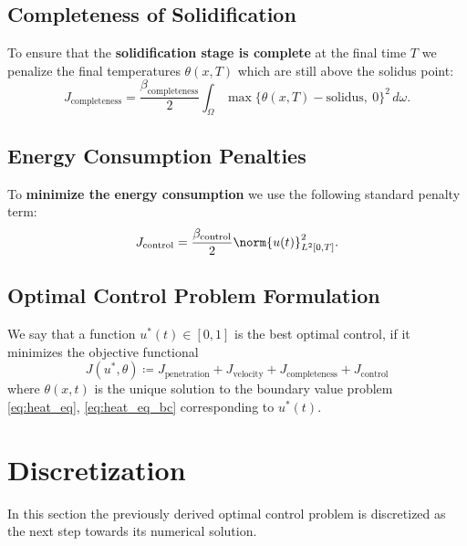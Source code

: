 \subsection{Completeness of Solidification}

To ensure that the \textbf{solidification stage is complete} at the final time $T$ we penalize the final temperatures $\theta(x, T)$ which are still above the solidus point:
\begin{equation}
	J_{\text{completeness}} =
	\frac{\beta_\text{completeness}}{2} \int_{\Omega} \max\{ \theta(x, T) - \text{solidus},\ 0 \}^2\, d\omega.
\end{equation}

\subsection{Energy Consumption Penalties}


To \textbf{minimize the energy consumption} we use the following standard penalty term:
\begin{equation}
	J_{\text{control}} =
	\frac{\beta_\text{control}}{2} \norm{u(t)}^2_{L^2[0,T]}.
\end{equation}



\subsection{Optimal Control Problem Formulation}

We say that a function $u^*(t) \in [0,1]$ is the best optimal control, if it minimizes the objective functional
\begin{equation} \label{eq:J}
	J(u^*, \theta) \coloneqq J_{\text{penetration}} + J_{\text{velocity}} + J_{\text{completeness}} + J_{\text{control}}
\end{equation}
where $\theta(x, t)$ is the unique solution to the boundary value problem \eqref{eq:heat_eq}, \eqref{eq:heat_eq_bc} corresponding to $u^*(t)$.


\section{Discretization}
\label{sec:discretization}

In this section the previously derived optimal control problem is discretized as the next step towards its numerical solution.

